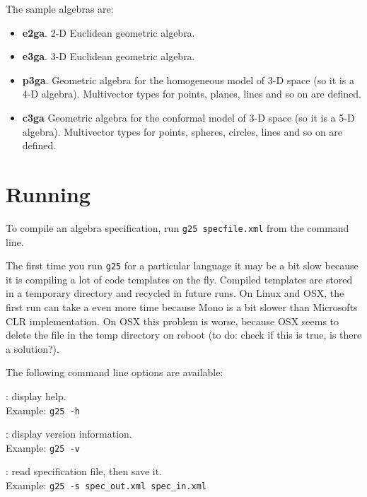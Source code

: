 \documentclass[10pt, a4paper]{article}
\begin{document}
The sample algebras are:
\begin{itemize}
\item {\bf e2ga}. 2-D Euclidean geometric algebra.
\item {\bf e3ga}. 3-D Euclidean geometric algebra.
\item {\bf p3ga}. Geometric algebra for the homogeneous model of 3-D space (so it is a 4-D algebra).
Multivector types for points, planes, lines and so on are defined.
\item {\bf c3ga} Geometric algebra for the conformal model of 3-D space (so it is a 5-D algebra).
Multivector types for points, spheres, circles, lines and so on are defined.
\end{itemize}


\section{Running}

To compile an algebra specification, run {\tt g25 specfile.xml} from the command line.
	
The first time you run {\tt g25} for a particular language 
it may be a bit slow because it is compiling a lot of code templates on the fly. 
Compiled templates are stored in a temporary 
directory and recycled in future runs.
On Linux and OSX, the first run can take a even more time because Mono is a bit
slower than Microsofts CLR implementation.
On OSX this problem is worse, because OSX seems to delete the file in the temp directory
on reboot (to do: check if this is true, is there a solution?).

	
The following command line options are available:

\vspace*{2mm}

: display help.\\
Example: {\tt g25 -h}

\vspace*{2mm}

: display version information.\\
Example: {\tt g25 -v}

\vspace*{2mm}

: read specification file, then save it.\\
Example: {\tt g25 -s spec\_out.xml spec\_in.xml}

\vspace*{2mm}
\end{document}
